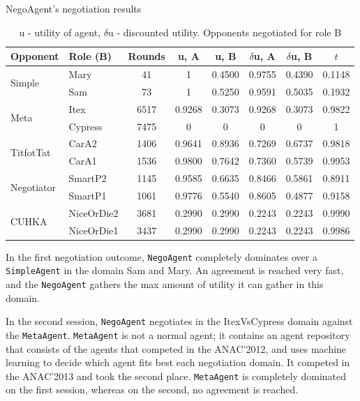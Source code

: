 \documentclass[html]{report}    %
\begin{document}
\begin{table}[htbp] 
	\centering %
	\caption{NegoAgent's negotiation results}
	\setlength{\tabcolsep}{0.5em}
	\begin{tabular}{llcccccc} %
		\toprule[0.15em] 
		 Opponent  &  Role (B) & Rounds & u, A & u, B & $\delta$u, A & $\delta$u, B & $t$\\ [0.5ex] %
		\midrule 
		\multirow{2}{*}{Simple}&Mary&41&1&0.4500&0.9755&0.4390&0.1148\\
		&Sam&73&1&0.5250&0.9591&0.5035&0.1932\\ 
		\midrule
		\multirow{2}{*}{Meta}&Itex&6517&0.9268&0.3073&0.9268&0.3073&0.9822\\
		&Cypress&7475&0&0&0&0&1\\
		\midrule
		\multirow{2}{*}{TitfotTat}&CarA2&1406&0.9641&0.8936&0.7269&0.6737&0.9818\\
		&CarA1&1536&0.9800&0.7642&0.7360&0.5739&0.9953\\
		\midrule
		\multirow{2}{*}{Negotiator}&SmartP2&1145&0.9585&0.6635&0.8466&0.5861&0.8911\\
		&SmartP1&1061&0.9776&0.5540&0.8605&0.4877&0.9158\\
		\midrule
		\multirow{2}{*}{CUHKA}&NiceOrDie2&3681&0.2990&0.2990&0.2243&0.2243&0.9990\\
		&NiceOrDie1&3437&0.2990&0.2990&0.2243&0.2243&0.9986\\
		\bottomrule[0.15em] 
	\end{tabular}
	 
	\caption*{u - utility of agent, $\delta$u - discounted utility. Opponents negotiated for role B} 
	\label{table:NegoSimpleResults} %
\end{table} 

In the first negotiation outcome, \texttt{NegoAgent} completely dominates over a \texttt{SimpleAgent}  in the domain Sam and Mary. An agreement is reached very fast, and the \texttt{NegoAgent} gathers the max amount of utility it can gather in this domain. 

In the second session, \texttt{NegoAgent} negotiates in the ItexVsCypress domain against the \texttt{MetaAgent}. \texttt{MetaAgent} is not a normal agent; it contains an agent repository that consists of the agents that competed in the ANAC'2012, and uses machine learning to decide which agent fits best each negotiation domain. It competed in the ANAC'2013 and took the second place. \texttt{MetaAgent} is completely dominated on the first session, whereas on the second, no agreement is reached.
\end{document}
